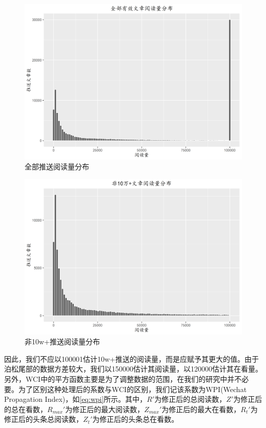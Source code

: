 \documentclass[a4paper,12pt,UTF8]{article}
\begin{document}
    \begin{figure}
      \centering
      \includegraphics[width=0.9\linewidth]{allR.png}
      \caption{全部推送阅读量分布}
      \label{fig:allR}
    \end{figure}
    \begin{figure}
      \centering
      \includegraphics[width=0.9\linewidth]{non10wR.png}
      \caption{非10w+推送阅读量分布}
      \label{fig:nonR}
    \end{figure}

    因此，我们不应以100001估计10w+推送的阅读量，而是应赋予其更大的值。由于泊松尾部的数据方差较大，我们以150000估计其阅读量，以120000估计其在看量。另外，WCI中的平方函数主要是为了调整数据的范围，在我们的研究中并不必要。为了区别这种处理后的系数与WCI的区别，我们记该系数为WPI(Wechat Propagation Index)，如\cref{eq:wpi}所示。其中，$R'$为修正后的总阅读数，$Z'$为修正后的总在看数，$R_{max}'$为修正后的最大阅读数，$Z_{max}'$为修正后的最大在看数，$R_t'$为修正后的头条总阅读数，$Z_t'$为修正后的头条总在看数。
\end{document}

